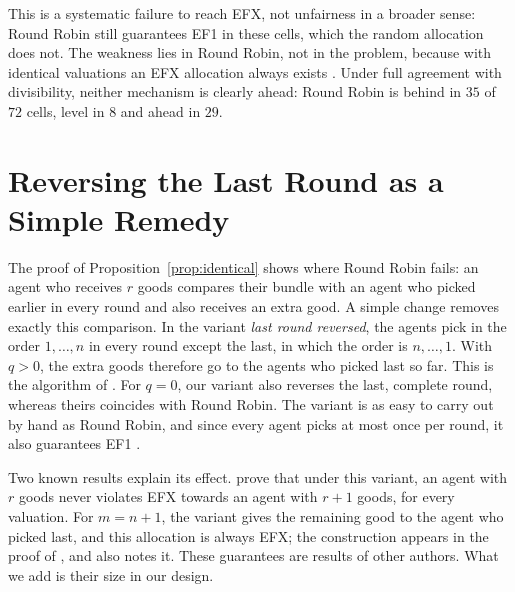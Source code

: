 This is a systematic failure to reach EFX, not unfairness in a broader sense: Round Robin still
guarantees EF1 in these cells, which the random allocation does not. The weakness lies in Round
Robin, not in the problem, because with identical valuations an EFX allocation always exists
\parencite{plaut2020}. Under full agreement with divisibility, neither mechanism is clearly ahead:
Round Robin is behind in $35$ of $72$ cells, level in $8$ and ahead in $29$.

\section{Reversing the Last Round as a Simple Remedy}\label{sec:reversed}

The proof of Proposition~\ref{prop:identical} shows where Round Robin fails: an agent who receives
$r$ goods compares their bundle with an agent who picked earlier in every round and also receives
an extra good. A simple change removes exactly this comparison. In the variant
\textit{last round reversed}, the agents pick in the order $1,\dots,n$ in every round except the
last, in which the order is $n,\dots,1$. With $q>0$, the extra goods therefore go to the agents who
picked last so far. This is the algorithm of \textcite[Sec.~5.1]{manurangsi2021}. For $q=0$, our
variant also reverses the last, complete round, whereas theirs coincides with Round Robin. The
variant is as easy to carry out by hand as Round Robin, and since every agent picks at most once
per round, it also guarantees EF1 \parencite[Prop.~2.1]{celine2026}.

Two known results explain its effect. \textcite[Claim~5.3]{manurangsi2021} prove that under this
variant, an agent with $r$ goods never violates EFX towards an agent with $r+1$ goods, for every
valuation. For $m=n+1$, the variant gives the remaining good to the agent who picked last, and
this allocation is always EFX; the construction appears in the proof of
\textcite[Thm.~5.1]{amanatidis2020multiple}, and \textcite[p.~8]{branzei2025} also notes it.
These guarantees are results of other authors. What we add is their size in our design.

